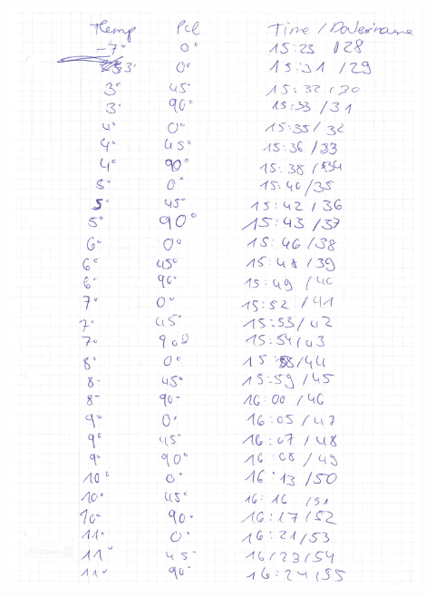 \documentclass[12pt]{article}
\begin{document}
\begin{minipage}{\textwidth}
	\centering
	\includegraphics[width=0.9\textwidth]{laborbuch/laborbuch3.pdf}
\end{minipage}
\end{document}
